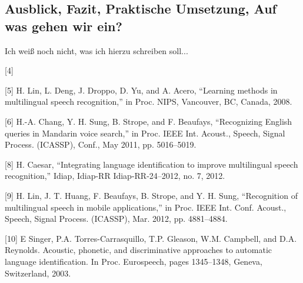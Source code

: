 \subsection{Ausblick, Fazit, Praktische Umsetzung, Auf was gehen wir ein?}
Ich weiß noch nicht, was ich hierzu schreiben soll...

[4] \cite{Schultz.1998}

[5] H. Lin, L. Deng, J. Droppo, D. Yu, and A. Acero, “Learning methods
in multilingual speech recognition,” in Proc. NIPS, Vancouver, BC,
Canada, 2008.

[6] H.-A. Chang, Y. H. Sung, B. Strope, and F. Beaufays, “Recognizing
English queries in Mandarin voice search,” in Proc. IEEE
Int. Acoust., Speech, Signal Process. (ICASSP), Conf., May 2011,
pp. 5016–5019.

[8] H. Caesar, “Integrating language identification to improve multilingual
speech recognition,” Idiap, Idiap-RR Idiap-RR-24–2012, no. 7,
2012.

[9] H. Lin, J. T. Huang, F. Beaufays, B. Strope, and Y. H. Sung, “Recognition
of multilingual speech in mobile applications,” in Proc. IEEE
Int. Conf. Acoust., Speech, Signal Process. (ICASSP), Mar. 2012, pp.
4881–4884.

[10] E Singer, P.A. Torres-Carrasquillo, T.P. Gleason, W.M.
Campbell, and D.A. Reynolds. Acoustic, phonetic, and
discriminative approaches to automatic language identification.
In Proc. Eurospeech, pages 1345–1348, Geneva,
Switzerland, 2003.